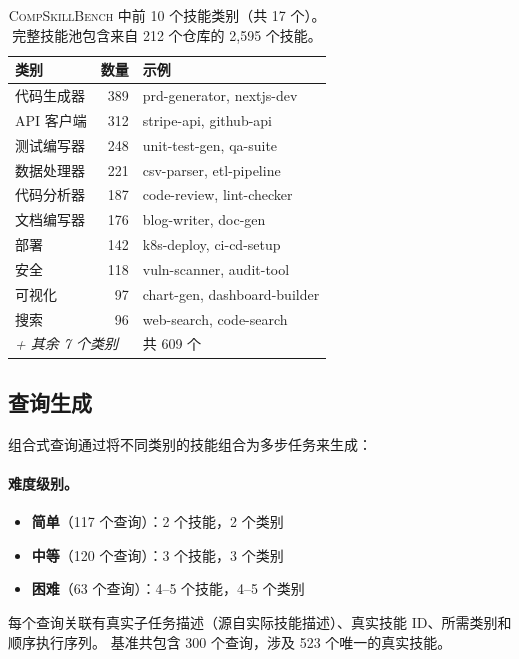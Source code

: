 \documentclass[11pt,a4paper]{ctexart}
\newcommand{\benchmark}{\textsc{CompSkillBench}}
\begin{document}
\begin{table}[t]
\centering
\small
\setlength{\tabcolsep}{4pt}
\begin{tabular}{lrl}
\toprule
\textbf{类别} & \textbf{数量} & \textbf{示例} \\
\midrule
代码生成器 & 389 & prd-generator, nextjs-dev \\
API 客户端 & 312 & stripe-api, github-api \\
测试编写器 & 248 & unit-test-gen, qa-suite \\
数据处理器 & 221 & csv-parser, etl-pipeline \\
代码分析器 & 187 & code-review, lint-checker \\
文档编写器 & 176 & blog-writer, doc-gen \\
部署 & 142 & k8s-deploy, ci-cd-setup \\
安全 & 118 & vuln-scanner, audit-tool \\
可视化 & 97 & chart-gen, dashboard-builder \\
搜索 & 96 & web-search, code-search \\
\midrule
\multicolumn{2}{l}{\textit{+ 其余 7 个类别}} & 共 609 个 \\
\bottomrule
\end{tabular}
\caption{\benchmark{} 中前 10 个技能类别（共 17 个）。完整技能池包含来自 212 个仓库的 2{,}595 个技能。}
\label{tab:categories}
\end{table}

\subsection{查询生成}

组合式查询通过将不同类别的技能组合为多步任务来生成：

\paragraph{难度级别。}
\begin{itemize}[nosep,leftmargin=*]
  \item \textbf{简单}（117 个查询）：2 个技能，2 个类别
  \item \textbf{中等}（120 个查询）：3 个技能，3 个类别
  \item \textbf{困难}（63 个查询）：4--5 个技能，4--5 个类别
\end{itemize}

每个查询关联有真实子任务描述（源自实际技能描述）、真实技能 ID、所需类别和顺序执行序列。
基准共包含 300 个查询，涉及 523 个唯一的真实技能。
\end{document}
